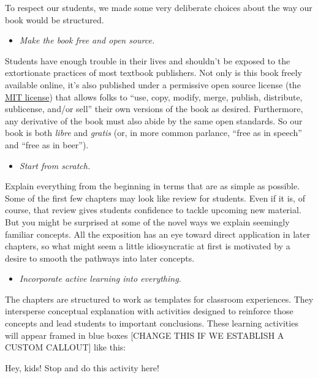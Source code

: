 \documentclass[
]{book}
\providecommand{\tightlist}{%
  \setlength{\itemsep}{0pt}\setlength{\parskip}{0pt}}
\begin{document}
To respect our students, we made some very deliberate choices about the way our book would be structured.

\begin{itemize}
\tightlist
\item
  \emph{Make the book free and open source.}
\end{itemize}

Students have enough trouble in their lives and shouldn't be exposed to the extortionate practices of most textbook publishers. Not only is this book freely available online, it's also published under a permissive open source license (the \href{https://opensource.org/licenses/MIT}{MIT license}) that allows folks to ``use, copy, modify, merge, publish, distribute, sublicense, and/or sell'' their own versions of the book as desired. Furthermore, any derivative of the book must also abide by the same open standards. So our book is both \emph{libre} and \emph{gratis} (or, in more common parlance, ``free as in speech'' and ``free as in beer'').

\begin{itemize}
\tightlist
\item
  \emph{Start from scratch.}
\end{itemize}

Explain everything from the beginning in terms that are as simple as possible. Some of the first few chapters may look like review for students. Even if it is, of course, that review gives students confidence to tackle upcoming new material. But you might be surprised at some of the novel ways we explain seemingly familiar concepts. All the exposition has an eye toward direct application in later chapters, so what might seem a little idiosyncratic at first is motivated by a desire to smooth the pathways into later concepts.

\begin{itemize}
\tightlist
\item
  \emph{Incorporate active learning into everything.}
\end{itemize}

The chapters are structured to work as templates for classroom experiences. They intersperse conceptual explanation with activities designed to reinforce those concepts and lead students to important conclusions. These learning activities will appear framed in blue boxes {[}CHANGE THIS IF WE ESTABLISH A CUSTOM CALLOUT{]} like this:

Hey, kids! Stop and do this activity here!
\end{document}
